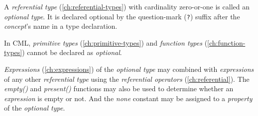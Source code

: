 A \emph{referential type} (\ref{ch:referential-types})
with cardinality zero-or-one is called an \emph{optional type}.
It is declared optional by the question-mark (\verb|?|) suffix
after the \emph{concept}'s name in a type declaration.

In CML, \emph{primitive types} (\ref{ch:primitive-types})
and \emph{function types} (\ref{ch:function-types})
cannot be declared as \emph{optional}.

\emph{Expressions} (\ref{ch:expressions})
of the \emph{optional type} may combined
with \emph{expressions} of any other \emph{referential type}
using the \emph{referential operators} (\ref{ch:referential}).
The \emph{empty()} and \emph{present()} functions may also be used
to determine whether an \emph{expression} is empty or not.
And the \emph{none} constant may be assigned to a \emph{property}
of the \emph{optional type}.
